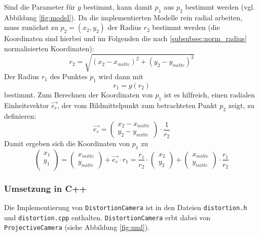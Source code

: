 Sind die Parameter für $g$ bestimmt, kann damit $p_1$ aus $p_2$ bestimmt werden (vgl. Abbildung \ref{fig:model}). Da die implementierten Modelle rein radial arbeiten, muss zunächst zu $p_2 = (x_2, y_2)$ der Radius $r_2$ bestimmt werden (die Koordinaten sind hierbei und im Folgenden die nach \ref{subsubsec:norm_radius} normalisierten Koordinaten):
\begin{equation}
r_2 = \sqrt{ (x_2 - x_{mitte})^2 + (y_2 - y_{mitte})^2 }
\end{equation}
Der Radius $r_1$ des Punktes $p_1$ wird dann mit 
\begin{equation}
r_1 = g(r_2)
\end{equation}
bestimmt. Zum Berechnen der Koordinaten von $p_1$ ist es hilfreich, einen radialen Einheitsvektor $\overrightarrow{e_r}$, der vom Bildmittelpunkt zum betrachteten Punkt $p_2$ zeigt, zu definieren:
\begin{equation}
\overrightarrow{e_r} = \begin{pmatrix} x_2 - x_{mitte} \\ y_2 - y_{mitte} \end{pmatrix} \cdot \frac{1}{r_2}
\end{equation}
Damit ergeben sich die Koordinaten von $p_1$ zu 
\begin{equation}
\begin{pmatrix} x_1 \\ y_1\\ \end{pmatrix} = 
\begin{pmatrix} x_{mitte} \\ y_{mitte} \end{pmatrix} + 
\overrightarrow{e_r} \cdot r_1 =
\frac{r_1}{r_2} \cdot
\begin{pmatrix} x_2 \\ y_2 \end{pmatrix} + 
\begin{pmatrix} x_{mitte} \\ y_{mitte} \end{pmatrix} \cdot
\frac{r_1}{r_2}
\end{equation}

\subsubsection{Umsetzung in C++}
Die Implementierung von \texttt{DistortionCamera} ist in den Dateien \texttt{distortion.h} und \linebreak \texttt{distortion.cpp} enthalten. \texttt{DistortionCamera} erbt dabei von \texttt{ProjectiveCamera} (siehe Abbildung \ref{fig:uml}).

